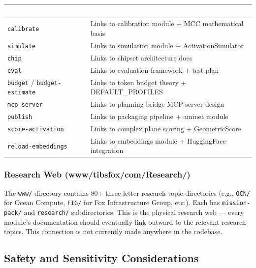 \documentclass[11pt,letterpaper]{article}
\newcommand{\tableheader}[1]{\textbf{\sffamily\textcolor{white}{#1}}}
\begin{document}
\begin{center}
\begin{tabularx}{\textwidth}{L{3.5cm}X}
\toprule
{}
\tableheader{Command} & \tableheader{Documentation Priority} \\
\midrule
\texttt{calibrate} & Links to calibration module + MCC mathematical basis \\
\texttt{simulate} & Links to simulation module + ActivationSimulator \\
\texttt{chip} & Links to chipset architecture docs \\
\texttt{eval} & Links to evaluation framework + test plan \\
\texttt{budget} / \texttt{budget-estimate} & Links to token budget theory + DEFAULT\_PROFILES \\
\texttt{mcp-server} & Links to planning-bridge MCP server design \\
\texttt{publish} & Links to packaging pipeline + aminet module \\
\texttt{score-activation} & Links to complex plane scoring + GeometricScore \\
\texttt{reload-embeddings} & Links to embeddings module + HuggingFace integration \\
\bottomrule
\end{tabularx}
\end{center}

\subsubsection{Research Web (www/tibsfox/com/Research/)}

The \texttt{www/} directory contains 80+ three-letter research topic directories (e.g., \texttt{OCN/} for Ocean Compute, \texttt{FIG/} for Fox Infrastructure Group, etc.). Each has \texttt{mission-pack/} and \texttt{research/} subdirectories. This is the physical research web --- every module's documentation should eventually link outward to the relevant research topics. This connection is not currently made anywhere in the codebase.

\subsection{Safety and Sensitivity Considerations}
\end{document}
